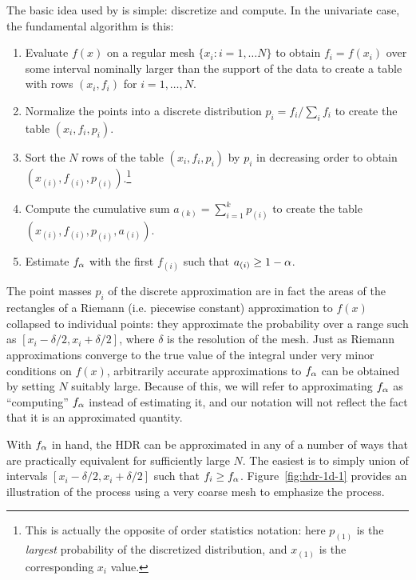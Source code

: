 The basic idea used by  is simple: discretize and compute. In the univariate case, the fundamental algorithm is this:
\begin{enumerate}
\item Evaluate $f(x)$ on a regular mesh $\{x_{i}: i = 1, \ldots N\}$ to obtain $f_{i} = f(x_{i})$ over some interval nominally larger than the support of the data to create a table with rows $(x_{i}, f_{i})$ for $i = 1, \ldots, N$.
\item Normalize the points into a discrete distribution $p_{i} = f_{i} / \sum_{i}f_{i}$ to create the table $(x_{i}, f_{i}, p_{i})$.
\item Sort the $N$ rows of the table $(x_{i}, f_{i}, p_{i})$ by $p_{i}$ in decreasing order to obtain $(x_{(i)}, f_{(i)}, p_{(i)})$.\footnote{This is actually the opposite of order statistics notation: here $p_{(1)}$ is the \emph{largest} probability of the discretized distribution, and $x_{(1)}$ is the corresponding $x_{i}$ value.}
\item Compute the cumulative sum $a_{(k)} = \sum_{i=1}^{k} p_{(i)}$  to create the table $(x_{(i)}, f_{(i)}, p_{(i)}, a_{(i)})$.
\item Estimate $f_{\alpha}$ with the first $f_{(i)}$ such that $a_{(i)} \geq 1 - \alpha$.
\end{enumerate}
The point masses $p_{i}$ of the discrete approximation are in fact the areas of the rectangles of a Riemann (i.e. piecewise constant) approximation to $f(x)$ collapsed to individual points: they approximate the probability over a range such as $[x_{i}-\delta/2, x_{i}+\delta/2]$, where $\delta$ is the resolution of the mesh. Just as Riemann approximations converge to the true value of the integral under very minor conditions on $f(x)$, arbitrarily accurate approximations to $f_{\alpha}$ can be obtained by setting $N$ suitably large. Because of this, we will refer to approximating $f_{\alpha}$ as ``computing'' $f_{\alpha}$ instead of estimating it, and our notation will not reflect the fact that it is an approximated quantity.

With $f_{\alpha}$ in hand, the HDR can be approximated in any of a number of ways that are practically equivalent for sufficiently large $N$. The easiest is to simply union of intervals $[x_{i}-\delta/2, x_{i}+\delta/2]$ such that $f_{i} \geq f_{\alpha}$. Figure~\ref{fig:hdr-1d-1} provides an illustration of the process using a very coarse mesh to emphasize the process.

\vspace{-1em}

